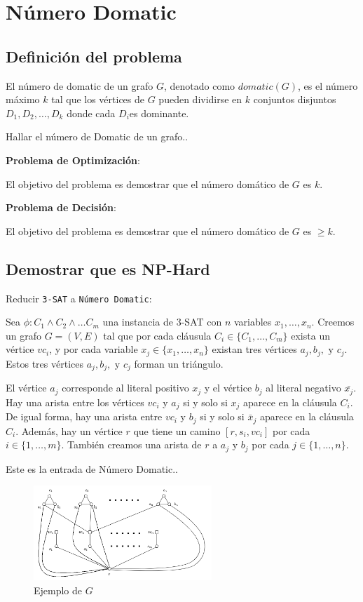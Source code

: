 \documentclass{article}
\begin{document}
\section{Número Domatic}

    \subsection{Definición del problema}
    El número de domatic de un grafo $G$, denotado como $domatic(G)$, es el número máximo $k$ tal que los vértices de $G$ pueden dividirse en $k$ conjuntos disjuntos $D_1,D_2,…,D_k$ donde cada $D_i$​ es dominante.

Hallar el número de Domatic de un grafo..


    \textbf{Problema de Optimización}:
    
    El objetivo del problema es demostrar que el número domático de \(G\) es  \(k\).

    \textbf{Problema de Decisión}:
    
    El objetivo del problema es demostrar que el número domático de \(G\) es  \(\geq k\).
    

\subsection{Demostrar que es NP-Hard}
Reducir \texttt{3-SAT} a \texttt{Número Domatic}:

Sea $\phi: C_1 \wedge C_2 \wedge \dotsc C_m$ una instancia de 3-SAT con \(n\) variables \(x_1,\dotsc,x_n\). Creemos un grafo \(G = (V,E)\) tal que por cada cláusula \(C_i \in \{C_1,\dotsc,C_m\}\) exista un vértice \(vc_i\), y por cada variable \(x_j \in \{x_1,\dotsc,x_n\}\) existan tres vértices \(a_j, b_j,\text{ y }  c_j\). Estos tres vértices  \(a_j, b_j, \text{ y } c_j\) forman un triángulo.

El vértice \(a_j\) corresponde al literal positivo \(x_j\) y el vértice \(b_j\) al literal negativo \(\bar{x_j}\). Hay una arista entre los vértices \(vc_i\) y \(a_j\) si y solo si \(x_j\) aparece en la cláusula \(C_i\).
De igual forma, hay una arista entre \(vc_i\) y \(b_j\) si y solo si \(\bar x_j\) aparece en la cláusula \(C_i\). Además, hay un vértice \(r\) que tiene un camino \([r,s_i,vc_i]\) por cada \(i \in \{1,\dotsc,m\}\). También  creamos una arista de \(r\) a \(a_j\) y \(b_j\) por cada \(j \in \{1,\dotsc,n\}\).

Este es la entrada de Número Domatic..


\begin{figure}[h]
    \centering
    \includegraphics[width=0.6\textwidth]{images/Domatic_number.png}
    \caption{Ejemplo de \(G\)}
    \label{fig:foto_carpeta}
\end{figure}
\end{document}
